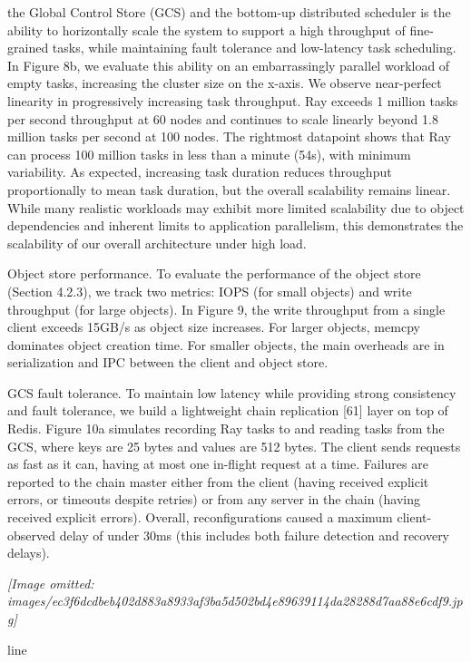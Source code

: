 \documentclass[
]{article}
\begin{document}
the Global Control Store (GCS) and the bottom-up distributed scheduler
is the ability to horizontally scale the system to support a high
throughput of fine-grained tasks, while maintaining fault tolerance and
low-latency task scheduling. In Figure 8b, we evaluate this ability on
an embarrassingly parallel workload of empty tasks, increasing the
cluster size on the x-axis. We observe near-perfect linearity in
progressively increasing task throughput. Ray exceeds 1 million tasks
per second throughput at 60 nodes and continues to scale linearly beyond
1.8 million tasks per second at 100 nodes. The rightmost datapoint shows
that Ray can process 100 million tasks in less than a minute (54s), with
minimum variability. As expected, increasing task duration reduces
throughput proportionally to mean task duration, but the overall
scalability remains linear. While many realistic workloads may exhibit
more limited scalability due to object dependencies and inherent limits
to application parallelism, this demonstrates the scalability of our
overall architecture under high load.

Object store performance. To evaluate the performance of the object
store (Section 4.2.3), we track two metrics: IOPS (for small objects)
and write throughput (for large objects). In Figure 9, the write
throughput from a single client exceeds 15GB/s as object size increases.
For larger objects, memcpy dominates object creation time. For smaller
objects, the main overheads are in serialization and IPC between the
client and object store.

GCS fault tolerance. To maintain low latency while providing strong
consistency and fault tolerance, we build a lightweight chain
replication {[}61{]} layer on top of Redis. Figure 10a simulates
recording Ray tasks to and reading tasks from the GCS, where keys are 25
bytes and values are 512 bytes. The client sends requests as fast as it
can, having at most one in-flight request at a time. Failures are
reported to the chain master either from the client (having received
explicit errors, or timeouts despite retries) or from any server in the
chain (having received explicit errors). Overall, reconfigurations
caused a maximum client-observed delay of under 30ms (this includes both
failure detection and recovery delays).

\textit{[Image omitted: images/ec3f6dcdbeb402d883a8933af3ba5d502bd4e89639114da28288d7aa88e6cdf9.jpg]}

line
\end{document}
